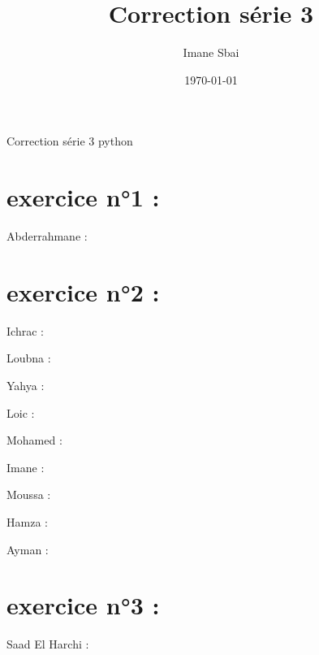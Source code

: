 \documentclass{article}
\title{Correction série 3}
\author{Imane Sbai}
\date {\today}
\begin{document}
\begin{titlepage}
    \begin{center}
Correction s\'{e}rie 3 python
    \end{center}
\end{titlepage}

\section{exercice n°1 :}
	\begin{center}
    		Abderrahmane :
	\end{center} 
\section{exercice n°2 :}

	\begin{center}
    		Ichrac :
	\end{center}
	
	
	\begin{center}
    		Loubna :
	\end{center} 
	

	\begin{center}
    		Yahya :
	\end{center} 
	

	\begin{center}
    		Loic :
	\end{center} 
	
	
	\begin{center}
    		Mohamed :
	\end{center}
	

	\begin{center}
    		Imane :
	\end{center} 
	
	
    	\begin{center}
    		Moussa :
	\end{center} 
	

    	\begin{center}
    		Hamza :
	\end{center} 


	\begin{center}
    		Ayman :
	\end{center} 
	
\section{exercice n°3 :}
        \begin{center}
    		Saad El Harchi :
	\end{center}    	  
        	
\end{document}
